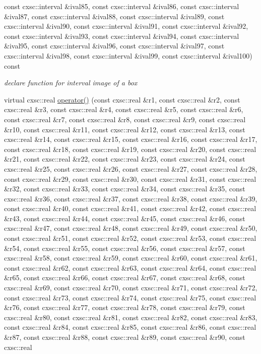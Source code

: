 \begin{DoxyCompactItemize}
const cxsc\-::interval \&ival85, const cxsc\-::interval \&ival86, const cxsc\-::interval \&ival87, const cxsc\-::interval \&ival88, const cxsc\-::interval \&ival89, const cxsc\-::interval \&ival90, const cxsc\-::interval \&ival91, const cxsc\-::interval \&ival92, const cxsc\-::interval \&ival93, const cxsc\-::interval \&ival94, const cxsc\-::interval \&ival95, const cxsc\-::interval \&ival96, const cxsc\-::interval \&ival97, const cxsc\-::interval \&ival98, const cxsc\-::interval \&ival99, const cxsc\-::interval \&ival100) const 
\begin{DoxyCompactList}\small\item\em declare function for interval image of a box \end{DoxyCompactList}\item 
virtual cxsc\-::real \hyperlink{classGaussianFobj100D_aab5b1387768ff96d70c88b4a85532753}{operator()} (const cxsc\-::real \&r1, const cxsc\-::real \&r2, const cxsc\-::real \&r3, const cxsc\-::real \&r4, const cxsc\-::real \&r5, const cxsc\-::real \&r6, const cxsc\-::real \&r7, const cxsc\-::real \&r8, const cxsc\-::real \&r9, const cxsc\-::real \&r10, const cxsc\-::real \&r11, const cxsc\-::real \&r12, const cxsc\-::real \&r13, const cxsc\-::real \&r14, const cxsc\-::real \&r15, const cxsc\-::real \&r16, const cxsc\-::real \&r17, const cxsc\-::real \&r18, const cxsc\-::real \&r19, const cxsc\-::real \&r20, const cxsc\-::real \&r21, const cxsc\-::real \&r22, const cxsc\-::real \&r23, const cxsc\-::real \&r24, const cxsc\-::real \&r25, const cxsc\-::real \&r26, const cxsc\-::real \&r27, const cxsc\-::real \&r28, const cxsc\-::real \&r29, const cxsc\-::real \&r30, const cxsc\-::real \&r31, const cxsc\-::real \&r32, const cxsc\-::real \&r33, const cxsc\-::real \&r34, const cxsc\-::real \&r35, const cxsc\-::real \&r36, const cxsc\-::real \&r37, const cxsc\-::real \&r38, const cxsc\-::real \&r39, const cxsc\-::real \&r40, const cxsc\-::real \&r41, const cxsc\-::real \&r42, const cxsc\-::real \&r43, const cxsc\-::real \&r44, const cxsc\-::real \&r45, const cxsc\-::real \&r46, const cxsc\-::real \&r47, const cxsc\-::real \&r48, const cxsc\-::real \&r49, const cxsc\-::real \&r50, const cxsc\-::real \&r51, const cxsc\-::real \&r52, const cxsc\-::real \&r53, const cxsc\-::real \&r54, const cxsc\-::real \&r55, const cxsc\-::real \&r56, const cxsc\-::real \&r57, const cxsc\-::real \&r58, const cxsc\-::real \&r59, const cxsc\-::real \&r60, const cxsc\-::real \&r61, const cxsc\-::real \&r62, const cxsc\-::real \&r63, const cxsc\-::real \&r64, const cxsc\-::real \&r65, const cxsc\-::real \&r66, const cxsc\-::real \&r67, const cxsc\-::real \&r68, const cxsc\-::real \&r69, const cxsc\-::real \&r70, const cxsc\-::real \&r71, const cxsc\-::real \&r72, const cxsc\-::real \&r73, const cxsc\-::real \&r74, const cxsc\-::real \&r75, const cxsc\-::real \&r76, const cxsc\-::real \&r77, const cxsc\-::real \&r78, const cxsc\-::real \&r79, const cxsc\-::real \&r80, const cxsc\-::real \&r81, const cxsc\-::real \&r82, const cxsc\-::real \&r83, const cxsc\-::real \&r84, const cxsc\-::real \&r85, const cxsc\-::real \&r86, const cxsc\-::real \&r87, const cxsc\-::real \&r88, const cxsc\-::real \&r89, const cxsc\-::real \&r90, const cxsc\-::real 
\end{DoxyCompactItemize}
